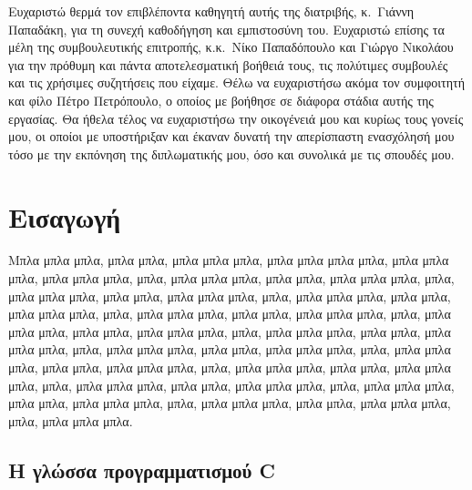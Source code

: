 \documentclass[diploma]{softlab-thesis}
\begin{document}

\begin{acknowledgementsgr}
Ευχαριστώ θερμά τον επιβλέποντα καθηγητή αυτής της διατριβής,
κ.~Γιάννη Παπαδάκη, για τη συνεχή καθοδήγηση και εμπιστοσύνη
του. Ευχαριστώ επίσης τα μέλη της συμβουλευτικής επιτροπής,
κ.κ.~Νίκο Παπαδόπουλο και Γιώργο Νικολάου για την πρόθυμη και
πάντα αποτελεσματική βοήθειά τους, τις πολύτιμες συμβουλές και
τις χρήσιμες συζητήσεις που είχαμε.  Θέλω να ευχαριστήσω ακόμα
τον συμφοιτητή και φίλο Πέτρο Πετρόπουλο, ο οποίος με βοήθησε σε
διάφορα στάδια αυτής της εργασίας.  Θα ήθελα τέλος να ευχαριστήσω
την οικογένειά μου και κυρίως τους γονείς μου, οι οποίοι με
υποστήριξαν και έκαναν δυνατή την απερίσπαστη ενασχόλησή μου τόσο
με την εκπόνηση της διπλωματικής μου, όσο και συνολικά με τις
σπουδές μου.
\end{acknowledgementsgr}



\tableofcontents
\listoftables
\listoffigures



\mainmatter

\chapter{Εισαγωγή}

Μπλα μπλα μπλα, μπλα μπλα, μπλα μπλα μπλα, μπλα μπλα μπλα μπλα,
μπλα μπλα μπλα, μπλα μπλα μπλα, μπλα, μπλα μπλα μπλα, μπλα μπλα,
μπλα μπλα μπλα, μπλα, μπλα μπλα μπλα, μπλα μπλα, μπλα μπλα μπλα,
μπλα, μπλα μπλα μπλα, μπλα μπλα, μπλα μπλα μπλα, μπλα, μπλα μπλα
μπλα, μπλα μπλα, μπλα μπλα μπλα, μπλα, μπλα μπλα μπλα, μπλα μπλα,
μπλα μπλα μπλα, μπλα, μπλα μπλα μπλα, μπλα μπλα, μπλα μπλα μπλα,
μπλα, μπλα μπλα μπλα, μπλα μπλα, μπλα μπλα μπλα, μπλα, μπλα μπλα
μπλα, μπλα μπλα, μπλα μπλα μπλα, μπλα, μπλα μπλα μπλα, μπλα μπλα,
μπλα μπλα μπλα, μπλα, μπλα μπλα μπλα, μπλα μπλα, μπλα μπλα μπλα,
μπλα, μπλα μπλα μπλα, μπλα μπλα, μπλα μπλα μπλα, μπλα, μπλα μπλα
μπλα, μπλα μπλα, μπλα μπλα μπλα, μπλα, μπλα μπλα μπλα.


\section{Η γλώσσα προγραμματισμού C}
\end{document}
